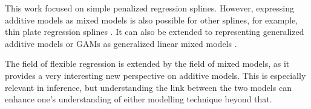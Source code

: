 \documentclass[12pt]{article}
\begin{document}
This work focused on simple penalized regression splines. However, expressing additive models as mixed models is also possible for other splines, for example, thin plate regression splines \cite{wood2011fast}. It can also be extended to representing generalized additive models or GAMs as generalized linear mixed models \cite{kneib2006mixed}.

The field of flexible regression is extended by the field of mixed models, as it provides a very interesting new perspective on additive models. This is especially relevant in inference, but understanding the link between the two models can enhance one's understanding of either modelling technique beyond that.




\newpage
\printbibliography
\end{document}

